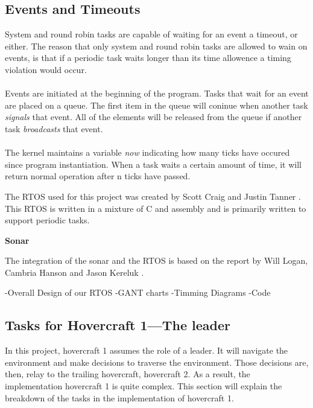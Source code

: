 \subsection{Events and Timeouts}

System and round robin tasks are capable of waiting for an event a timeout, or
either. The reason that only system and round robin tasks are allowed to wain on events, is that if a periodic task waits longer than its time allowence a timing violation would occur. \\

\\
Events are initiated at the beginning of the program. Tasks that wait for an event are placed on a queue. The first item in the queue will coninue when another task \textit{signals} that event. All of the elements will be released from the queue if another task \textit{broadcasts} that event. \\

\\
The kernel maintains a variable \textit{now} indicating how many ticks have occured since program instantiation. When a task waits a certain amount of time, it will return normal operation after n ticks have passed.





The RTOS used for this project was created by Scott Craig and Justin Tanner \cite{RTOSSJ}. This RTOS is written in a mixture of C and assembly and is primarily written to support periodic tasks.   




\noindent\textbf{Sonar}

The integration of the sonar and the RTOS is based on the report by Will
Logan, Cambria Hanson and Jason Kereluk \cite{autoB}.

-Overall Design of our RTOS
-GANT charts
-Timming Diagrams
-Code

\subsection{Tasks for Hovercraft 1---The leader}
In this project, hovercraft 1 assumes the role of a leader. It will navigate the
environment and make decisions to traverse the environment. Those decisions are,
then, relay to the trailing hovercraft, hovercraft 2. As a result, the
implementation hovercraft 1 is quite complex. This section will explain the
breakdown of the tasks in the implementation of hovercraft 1.

